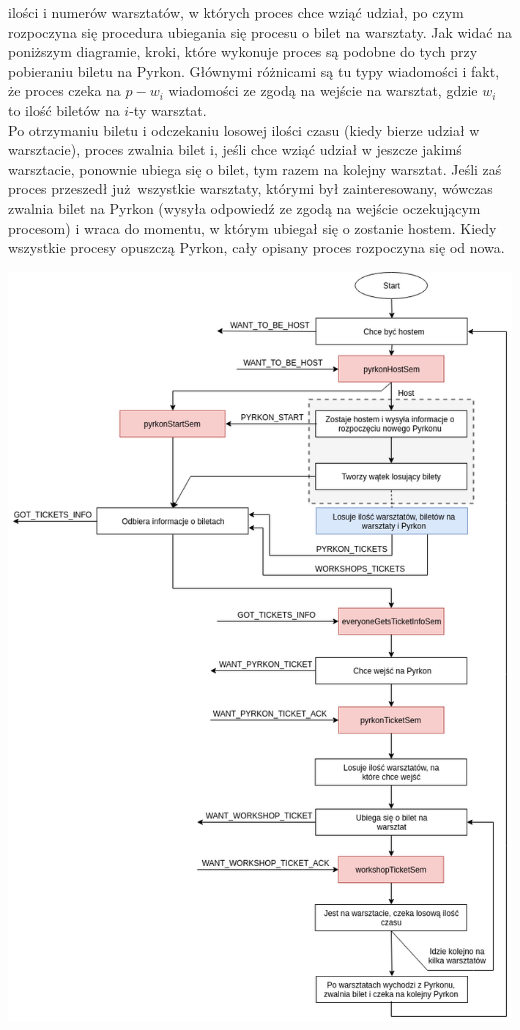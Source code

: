 \documentclass[10pt,a4paper]{article}
\begin{document}
ilości i numerów warsztatów, w których proces chce wziąć udział, po czym rozpoczyna się procedura ubiegania
się procesu o bilet na warsztaty. Jak widać na poniższym diagramie, kroki, które wykonuje proces są 
podobne do tych przy pobieraniu biletu na Pyrkon. Głównymi różnicami są tu typy wiadomości i fakt, że 
proces czeka na $p-w_i$ wiadomości ze zgodą na wejście na warsztat, gdzie $w_i$ to ilość biletów na $i$-ty warsztat.\\
Po otrzymaniu biletu i odczekaniu losowej ilości czasu (kiedy bierze udział w warsztacie), proces 
zwalnia bilet i, jeśli chce wziąć udział w jeszcze jakimś warsztacie, ponownie ubiega się o bilet,
tym razem na kolejny warsztat. Jeśli zaś proces przeszedł już wszystkie warsztaty, którymi był
zainteresowany, wówczas zwalnia bilet na Pyrkon (wysyła odpowiedź ze zgodą na wejście oczekującym procesom)
i wraca do momentu, w którym ubiegał się o zostanie hostem. Kiedy wszystkie procesy opuszczą Pyrkon,
cały opisany proces rozpoczyna się od nowa.


\newpage
\includegraphics[height=\textheight]{diagram.png}
\end{document}
